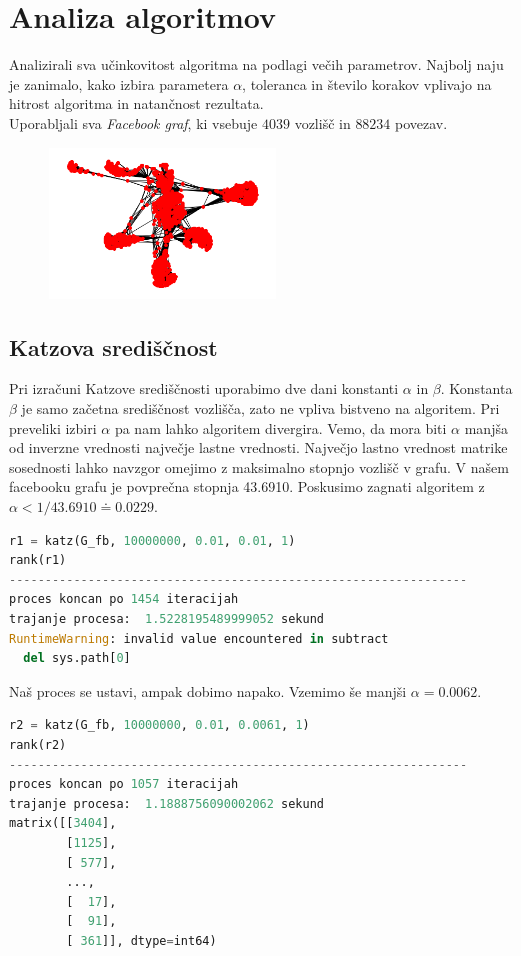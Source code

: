 \documentclass[a4paper]{article}
\begin{document}
\section{Analiza algoritmov}
\hspace{4.8mm}Analizirali sva učinkovitost algoritma na podlagi večih parametrov. Najbolj naju je zanimalo, kako izbira parametera $\alpha$, toleranca in število korakov vplivajo na hitrost algoritma in natančnost rezultata. \\
Uporabljali sva \textit{Facebook graf}, ki vsebuje $4039$ vozlišč in $88234$ povezav.
\begin{figure}[h]
\begin{center} 
\includegraphics[width=6cm]{Facebook_graph.png}
\end{center}
\end{figure}

\subsection{Katzova središčnost}
Pri izračuni Katzove središčnosti uporabimo dve dani konstanti $\alpha$ in $\beta.$ Konstanta $\beta$ je samo začetna središčnost vozlišča, zato ne vpliva bistveno na algoritem. Pri preveliki izbiri $\alpha$ pa nam lahko algoritem divergira. Vemo, da mora biti $\alpha$ manjša od inverzne vrednosti največje lastne vrednosti. Največjo lastno vrednost matrike sosednosti lahko navzgor omejimo z maksimalno stopnjo vozlišč v grafu. V našem facebooku grafu je povprečna stopnja 43.6910. Poskusimo zagnati algoritem z $\alpha < 1/43.6910 \doteq 0.0229.$

\begin{lstlisting}[language=Python]
r1 = katz(G_fb, 10000000, 0.01, 0.01, 1)
rank(r1)
----------------------------------------------------------------
proces koncan po 1454 iteracijah
trajanje procesa:  1.5228195489999052 sekund
RuntimeWarning: invalid value encountered in subtract
  del sys.path[0]
\end{lstlisting}

Naš proces se ustavi, ampak dobimo napako. Vzemimo še manjši $\alpha = 0.0062.$
\begin{lstlisting}[language=Python]
r2 = katz(G_fb, 10000000, 0.01, 0.0061, 1)
rank(r2)
----------------------------------------------------------------
proces koncan po 1057 iteracijah
trajanje procesa:  1.1888756090002062 sekund
matrix([[3404],
        [1125],
        [ 577],
        ...,
        [  17],
        [  91],
        [ 361]], dtype=int64)
\end{lstlisting}
\end{document}
